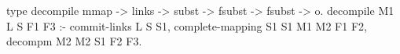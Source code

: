   type decompile mmap -> links -> subst ->
    fsubst -> fsubst -> o.
  decompile M1 L S F1 F3 :- 
    commit-links L S S1,
    complete-mapping S1 S1 M1 M2 F1 F2,
    decompm M2 M2 S1 F2 F3.

